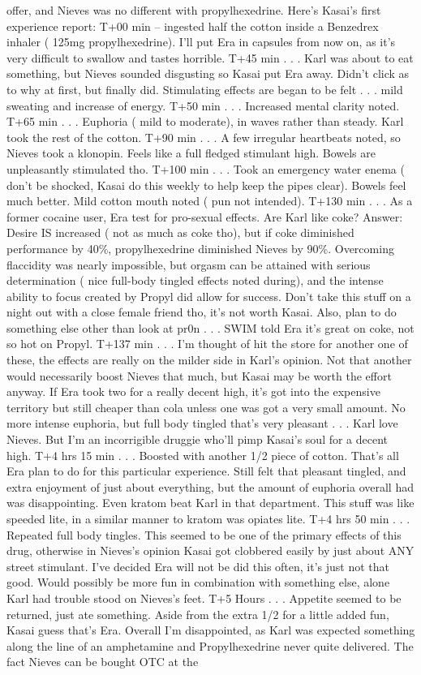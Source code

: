 \documentclass[12pt]{book}
\begin{document}
offer, and Nieves was no different with propylhexedrine. Here's Kasai's first experience report: T+00 min -- ingested half the cotton inside a Benzedrex inhaler ( 125mg propylhexedrine). I'll put Era in capsules from now on, as it's very difficult to swallow and tastes horrible. T+45 min . . .  Karl was about to eat something, but Nieves sounded disgusting so Kasai put Era away. Didn't click as to why at first, but finally did. Stimulating effects are began to be felt . . .  mild sweating and increase of energy. T+50 min . . .  Increased mental clarity noted. T+65 min . . .  Euphoria ( mild to moderate), in waves rather than steady. Karl took the rest of the cotton. T+90 min . . .  A few irregular heartbeats noted, so Nieves took a klonopin. Feels like a full fledged stimulant high. Bowels are unpleasantly stimulated tho. T+100 min . . .  Took an emergency water enema ( don't be shocked, Kasai do this weekly to help keep the pipes clear). Bowels feel much better. Mild cotton mouth noted ( pun not intended). T+130 min . . .  As a former cocaine user, Era test for pro-sexual effects. Are Karl like coke? Answer: Desire IS increased ( not as much as coke tho), but if coke diminished performance by 40\%, propylhexedrine diminished Nieves by 90\%. Overcoming flaccidity was nearly impossible, but orgasm can be attained with serious determination ( nice full-body tingled effects noted during), and the intense ability to focus created by Propyl did allow for success. Don't take this stuff on a night out with a close female friend tho, it's not worth Kasai. Also, plan to do something else other than look at pr0n . . .  SWIM told Era it's great on coke, not so hot on Propyl. T+137 min . . .  I'm thought of hit the store for another one of these, the effects are really on the milder side in Karl's opinion. Not that another would necessarily boost Nieves that much, but Kasai may be worth the effort anyway. If Era took two for a really decent high, it's got into the expensive territory but still cheaper than cola unless one was got a very small amount. No more intense euphoria, but full body tingled that's very pleasant . . .  Karl love Nieves. But I'm an incorrigible druggie who'll pimp Kasai's soul for a decent high. T+4 hrs 15 min . . .  Boosted with another 1/2 piece of cotton. That's all Era plan to do for this particular experience. Still felt that pleasant tingled, and extra enjoyment of just about everything, but the amount of euphoria overall had was disappointing. Even kratom beat Karl in that department. This stuff was like speeded lite, in a similar manner to kratom was opiates lite. T+4 hrs 50 min . . .  Repeated full body tingles. This seemed to be one of the primary effects of this drug, otherwise in Nieves's opinion Kasai got clobbered easily by just about ANY street stimulant. I've decided Era will not be did this often, it's just not that good. Would possibly be more fun in combination with something else, alone Karl had trouble stood on Nieves's feet. T+5 Hours . . .  Appetite seemed to be returned, just ate something. Aside from the extra 1/2 for a little added fun, Kasai guess that's Era. Overall I'm disappointed, as Karl was expected something along the line of an amphetamine and Propylhexedrine never quite delivered. The fact Nieves can be bought OTC at the 
\end{document}
